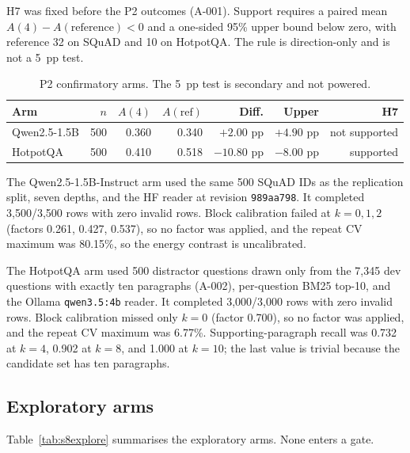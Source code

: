 H7 was fixed before the P2 outcomes (A-001). Support requires a paired mean
$A(4)-A(\text{reference})<0$ and a one-sided 95\% upper bound below zero, with
reference 32 on SQuAD and 10 on HotpotQA. The rule is direction-only and is not a
5~pp test.

\begin{table}[pos=htbp]
  \centering
  \caption{P2 confirmatory arms. The 5~pp test is secondary and not powered.}
  \label{tab:s8confirm}
  \footnotesize
  \begin{tabular}{@{}lrrrrrr@{}}
    \toprule
    \textbf{Arm} & $n$ & $A(4)$ & $A(\text{ref})$ & \textbf{Diff.} & \textbf{Upper} & \textbf{H7} \\
    \midrule
    Qwen2.5-1.5B & 500 & 0.360 & 0.340 & $+2.00$ pp & $+4.90$ pp & not supported \\
    HotpotQA & 500 & 0.410 & 0.518 & $-10.80$ pp & $-8.00$ pp & supported \\
    \bottomrule
  \end{tabular}
\end{table}

The Qwen2.5-1.5B-Instruct arm used the same 500 SQuAD IDs as the replication
split, seven depths, and the HF reader at revision \texttt{989aa798}. It
completed 3{,}500/3{,}500 rows with zero invalid rows. Block calibration failed
at $k=0,1,2$ (factors 0.261, 0.427, 0.537), so no factor was applied, and the
repeat CV maximum was 80.15\%, so the energy contrast is uncalibrated.

The HotpotQA arm used 500 distractor questions drawn only from the 7{,}345 dev
questions with exactly ten paragraphs (A-002), per-question BM25 top-10, and the
Ollama \texttt{qwen3.5:4b} reader. It completed 3{,}000/3{,}000 rows with zero
invalid rows. Block calibration missed only $k=0$ (factor 0.700), so no factor
was applied, and the repeat CV maximum was 6.77\%. Supporting-paragraph recall
was 0.732 at $k=4$, 0.902 at $k=8$, and 1.000 at $k=10$; the last value is
trivial because the candidate set has ten paragraphs.

\subsection{Exploratory arms}

Table~\ref{tab:s8explore} summarises the exploratory arms. None enters a gate.

